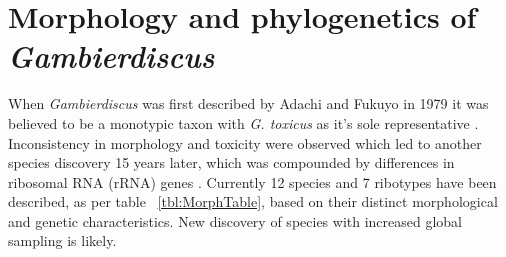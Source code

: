\documentclass[12pt]{article}
\begin{document}
\section{Morphology and phylogenetics of \emph{Gambierdiscus}}

When \emph{Gambierdiscus} was first described by Adachi and Fukuyo in 1979 it was believed to be a monotypic taxon with \emph{G. toxicus} as it's sole representative \cite{adachi1979thecal}. Inconsistency in morphology and toxicity were observed which led to another species discovery 15 years later, which was compounded by differences in ribosomal RNA (rRNA) genes \cite{faust1995observation,holmes1990toxicity,holmes1991strain,chinain1997intraspecific,richlen2008phylogeography,bomber1988epiphytic,bomber1989epiphytism,bomber1989genitic,morton1993response}. Currently 12 species and 7 ribotypes have been described, as per table ~\ref{tbl:MorphTable}, based on their distinct morphological and genetic characteristics. New discovery of species with increased global sampling is likely. \\
\end{document}
